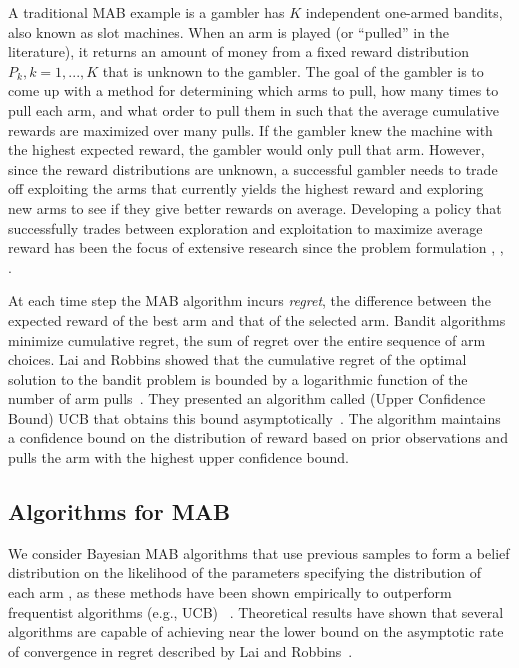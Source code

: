 \documentclass[10pt, conference]{ieeeconf}      %
\begin{document}
A traditional MAB example is a gambler has $K$ independent one-armed bandits, also known as slot machines.
When an arm is played (or ``pulled'' in the literature), it returns an amount of money from a fixed reward distribution $P_k, k = 1, ..., K$ that is unknown to the gambler.
The goal of the gambler is to come up with a method for determining which arms to pull, how many times to pull each arm, and what order to pull them in such that the average cumulative rewards are maximized over many pulls.
If the gambler knew the machine with the highest expected reward, the gambler would only pull that arm.
However, since the reward distributions are unknown, a successful gambler needs to trade off exploiting the arms that currently yields the highest reward and exploring new arms to see if they give better rewards on average.
Developing a policy that successfully trades between exploration and exploitation to maximize average reward has been the focus of extensive research since the problem formulation \cite{bubeck2009pure}, \cite{robbins1985some}, \cite{bergemann2006bandit}.

At each time step the MAB algorithm incurs \textit{regret}, the difference between the expected reward of the best arm and that of the selected arm. Bandit algorithms minimize cumulative regret, the sum of regret over the entire sequence of arm choices.
Lai and Robbins showed that the cumulative regret of the optimal solution to the bandit problem is bounded by a logarithmic function of the number of arm pulls~\cite{lai1985asymptotically}.
They presented an algorithm called (Upper Confidence Bound) UCB that obtains this bound asymptotically~\cite{lai1985asymptotically}.
The algorithm maintains a confidence bound on the distribution of reward based on prior observations and pulls the arm with the highest upper confidence bound.




\subsection{Algorithms for MAB}\label{sec:bandit_algorithm}
We consider Bayesian MAB algorithms that use previous samples to form a belief distribution on the likelihood of the parameters specifying the distribution of each arm \cite{weber1992gittins,agrawal2011analysis}, as these methods have been shown empirically to outperform frequentist algorithms (e.g., UCB) ~\cite{chapelle2011empirical, bachman2013greedy}. Theoretical results have shown that several algorithms are capable of achieving near the lower bound on the asymptotic rate of convergence in regret described by Lai and Robbins~\cite{gittins1983dynamic, agrawal2011analysis, kaufmann2012bayesian}.
\end{document}
